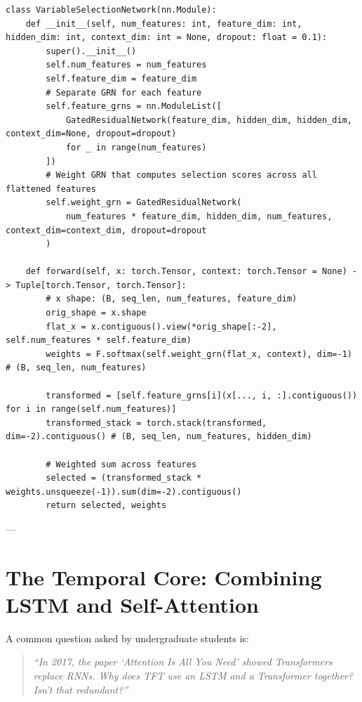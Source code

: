\documentclass[11pt,a4paper]{article}
\begin{document}
\begin{codebox}
\begin{lstlisting}
class VariableSelectionNetwork(nn.Module):
    def __init__(self, num_features: int, feature_dim: int, hidden_dim: int, context_dim: int = None, dropout: float = 0.1):
        super().__init__()
        self.num_features = num_features
        self.feature_dim = feature_dim
        # Separate GRN for each feature
        self.feature_grns = nn.ModuleList([
            GatedResidualNetwork(feature_dim, hidden_dim, hidden_dim, context_dim=None, dropout=dropout)
            for _ in range(num_features)
        ])
        # Weight GRN that computes selection scores across all flattened features
        self.weight_grn = GatedResidualNetwork(
            num_features * feature_dim, hidden_dim, num_features, context_dim=context_dim, dropout=dropout
        )

    def forward(self, x: torch.Tensor, context: torch.Tensor = None) -> Tuple[torch.Tensor, torch.Tensor]:
        # x shape: (B, seq_len, num_features, feature_dim)
        orig_shape = x.shape
        flat_x = x.contiguous().view(*orig_shape[:-2], self.num_features * self.feature_dim)
        weights = F.softmax(self.weight_grn(flat_x, context), dim=-1) # (B, seq_len, num_features)
        
        transformed = [self.feature_grns[i](x[..., i, :].contiguous()) for i in range(self.num_features)]
        transformed_stack = torch.stack(transformed, dim=-2).contiguous() # (B, seq_len, num_features, hidden_dim)
        
        # Weighted sum across features
        selected = (transformed_stack * weights.unsqueeze(-1)).sum(dim=-2).contiguous()
        return selected, weights
\end{lstlisting}
\end{codebox}

---

\section{The Temporal Core: Combining LSTM and Self-Attention}

A common question asked by undergraduate students is:
\begin{quote}
\textit{``In 2017, the paper `Attention Is All You Need' showed Transformers replace RNNs. Why does TFT use an LSTM and a Transformer together? Isn't that redundant?''}
\end{quote}
\end{document}
